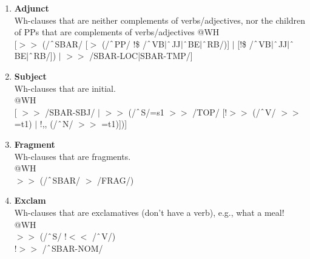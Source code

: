 \begin{enumerate}
\begin{enumerate}
            
            \item \textbf{Adjunct}\\ 
            Wh-clauses that are neither complements of verbs/adjectives, nor the children of PPs that are complements of verbs/adjectives
            @WH\\
            {}[$>\!\!>$ (/$\string^$SBAR/ [$>$ (/$\string^$PP/ !\$ /$\string^$VB$|\string^$JJ$|\string^$BE$|\string^$RB/)] $|$ [!\$ /$\string^$VB$|\string^$JJ$|\string^$BE$|\string^$RB/]) $|$ $>\!\!>$ /SBAR-LOC|SBAR-TMP/]

            \item \textbf{Subject}\\
            Wh-clauses that are initial.\\
             @WH \\
            {}[ $>\!\!>$ /SBAR-SBJ/ $|$ $>\!\!>$ (/$\string^$S/=s1 $>\!\!>$ /TOP/ [!$>\!\!>$ (/$\string^$V/ $>\!\!>$ =t1) $|$ !,, (/$\string^$N/ $>\!\!>$ =t1)])]

            \item \textbf{Fragment}\\
            Wh-clauses that are fragments.\\
             @WH \\
            $>\!\!>$ (/$\string^$SBAR/ $>$ /FRAG/)
            
            \item \textbf{Exclam} \\
            Wh-clauses that are exclamatives (don't have a verb), e.g., \textsf{what a meal!}\\
            @WH\\ 
            $>\!\!>$ (/$\string^$S/ !$<\!\!<$ /$\string^$V/) \\
            !$>\!\!>$ /$\string^$SBAR-NOM/
        \end{enumerate}
   

\end{enumerate}
